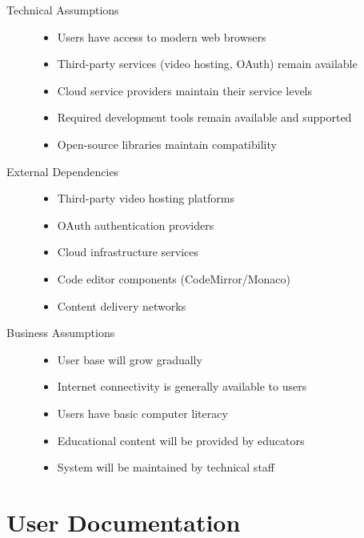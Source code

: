 \documentclass[a4paper, 11pt]{scrreprt}
\begin{document}
\begin{description}
    \item[Technical Assumptions]
        \begin{itemize}
            \item Users have access to modern web browsers
            \item Third-party services (video hosting, OAuth) remain available
            \item Cloud service providers maintain their service levels
            \item Required development tools remain available and supported
            \item Open-source libraries maintain compatibility
        \end{itemize}
    
    \item[External Dependencies]
        \begin{itemize}
            \item Third-party video hosting platforms
            \item OAuth authentication providers
            \item Cloud infrastructure services
            \item Code editor components (CodeMirror/Monaco)
            \item Content delivery networks
        \end{itemize}
    
    \item[Business Assumptions]
        \begin{itemize}
            \item User base will grow gradually
            \item Internet connectivity is generally available to users
            \item Users have basic computer literacy
            \item Educational content will be provided by educators
            \item System will be maintained by technical staff
        \end{itemize}
\end{description}

\section{User Documentation}
\end{document}
